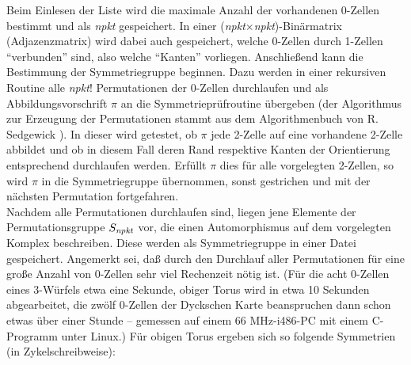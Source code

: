 Beim Einlesen der Liste wird die maximale Anzahl der vorhandenen 0-Zellen
bestimmt und als {\it npkt} gespeichert. In einer
({\it npkt}$\times${\it npkt})-Binärmatrix (Adjazenzmatrix) wird dabei auch
gespeichert, welche 0-Zellen durch 1-Zellen "`verbunden"' sind, also welche
"`Kanten"' vorliegen. Anschließend kann die Bestimmung der Symmetriegruppe
beginnen. Dazu werden in einer rekursiven Routine alle {\it npkt}! Permutationen
der 0-Zellen durchlaufen und als Abbildungsvorschrift $\pi$ an die
Symmetrieprüfroutine übergeben (der Algorithmus zur Erzeugung der
Permutationen stammt aus dem Algorithmenbuch von R. Sedgewick \cite{Sed:91}).
In dieser wird getestet, ob $\pi$ jede 2-Zelle auf eine vorhandene
2-Zelle abbildet und ob in diesem Fall deren Rand respektive Kanten der
Orientierung entsprechend durchlaufen werden. Erfüllt $\pi$ dies für alle
vorgelegten 2-Zellen, so wird $\pi$ in die Symmetriegruppe übernommen, sonst
gestrichen und mit der nächsten Permutation fortgefahren.\\
Nachdem alle Permutationen durchlaufen sind, liegen jene Elemente der
Permutationsgruppe $S_{\it npkt}$ vor, die einen Automorphismus auf dem
vorgelegten Komplex beschreiben. Diese werden als Symmetriegruppe in einer
Datei gespeichert. Angemerkt sei, daß durch den Durchlauf aller Permutationen
für eine große Anzahl von 0-Zellen sehr viel Rechenzeit nötig ist.
{\scsi
(Für die acht 0-Zellen eines 3-Würfels etwa eine Sekunde, obiger Torus wird
in etwa 10 Sekunden abgearbeitet, die zwölf 0-Zellen der Dyckschen Karte
beanspruchen dann schon etwas über einer Stunde -- gemessen auf einem
66 MHz-i486-PC mit einem C-Programm unter Linux.)} Für obigen Torus ergeben
sich so folgende Symmetrien (in Zykelschreibweise):
